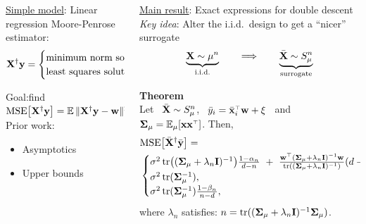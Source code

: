 \documentclass{beamer}
\begin{document}
\begin{frame}
\begin{columns}
\begin{column}{0.32\textwidth}
\begin{block}{\underline{Simple model}: Linear regression}
  Moore-Penrose estimator:
  \begin{align*}
    \mathbf X^\dagger\mathbf y =
  \begin{cases}
    \text{minimum norm solution},& \text{for }n\leq d,\\
    \text{least squares solution},& \text{for }n>d.
  \end{cases}
  \end{align*}
\vspace{5mm}
  
  Goal:\quad find\quad${\mathrm{MSE}\big[\mathbf X^\dagger\mathbf y\big]}=\mathbb E\,\|\mathbf X^\dagger\mathbf y-\mathbf w\|^2$\\[5mm]
  Prior work: \\

  \begin{itemize}
  \item   Asymptotics \cite{HMRT19_TR}
  \item Upper bounds \cite{BLLT19_TR}
  \end{itemize}
  \vspace{3mm}
  
  \vspace{5mm}
  
\end{block}

\end{column}

\begin{column}{.32\textwidth}

\begin{block}{\underline{Main result}: Exact expressions for double descent}
 \textit{Key idea}: Alter the i.i.d.~design to get a ``nicer'' surrogate
  \begin{align*}
    \underbrace{\mathbf X\sim\mu^n}_{\text{i.i.d.}}\qquad\Longrightarrow\qquad
    \underbrace{{\bar{\mathbf X}}\sim S_\mu^n}_{\text{surrogate}} 
  \end{align*}
  \vspace{-1cm}
  
\textbf{Theorem}\\
  Let \ ${\bar{\mathbf X}}\sim S_\mu^n$, \ $\yb_i=\xbb_i^\top\w+\xi$ \ and \
$\Sigmab_\mu=\E_\mu[\x\x^\top]$. Then,
{\small  \begin{align*}
 &\MSE{\Xb^\dagger\ybb} =\\
  &  \begin{cases}
    \sigma^2\,\tr\big((\Sigmab_\mu+\lambda_n\I)^{-1}\big)
    \frac{1-\alpha_n}{d-n}\ +\
\frac{\w^{\top}(\Sigmab_\mu+\lambda_n\I)^{-1}\w}
{\tr((\Sigmab_\mu+\lambda_n\I)^{-1})}(d-n),
& (n<d),\\
\sigma^2\, \tr(\Sigmab_\mu^{-1}),& (n=d),\\
\sigma^2\,\tr(\Sigmab_\mu^{-1})\frac{1-\beta_n}{n-d},&(n>d),
\end{cases}
  \end{align*}}
 where $\lambda_n$ satisfies: $n=\mathrm{tr}((\mathbf{\Sigma}_\mu+\lambda_n\mathbf I)^{-1}\mathbf{\Sigma}_\mu)$.
\end{block}


\end{column}
\end{columns}
\end{frame}
\end{document}

